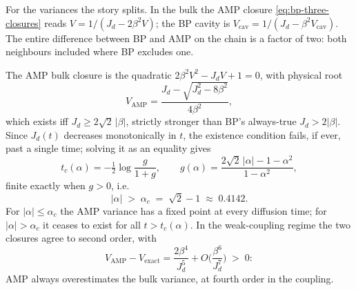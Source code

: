 For the variances the story splits. In the bulk the AMP closure
\eqref{eq:bp-three-closures} reads $V = 1/(J_d - 2\beta^2 V)$; the BP
cavity is $V_{\mathrm{cav}} = 1/(J_d - \beta^2 V_{\mathrm{cav}})$. The
entire difference between BP and AMP on the chain is a factor of two:
both neighbours included where BP excludes one.

\begin{theorem}
\label{thm:bp-amp-breakdown}
The AMP bulk closure is the quadratic $2\beta^2 V^2 - J_d V + 1 = 0$,
with physical root
\begin{equation}
  V_{\mathrm{AMP}}
  = \frac{J_d - \sqrt{J_d^2 - 8\beta^2}}{4\beta^2},
  \label{eq:bp-amp-var}
\end{equation}
which exists iff $J_d \geq 2\sqrt{2}\,|\beta|$, strictly stronger than
BP's always-true $J_d > 2|\beta|$. Since $J_d(t)$ decreases monotonically
in $t$, the existence condition fails, if ever, past a single time;
solving it as an equality gives
\begin{equation}
  \boxed{\;
  t_c(\alpha) = -\tfrac{1}{2} \log \frac{g}{1+g},
  \qquad
  g(\alpha) = \frac{2\sqrt{2}\,|\alpha| - 1 - \alpha^2}{1 - \alpha^2},
  \;}
  \label{eq:bp-tc}
\end{equation}
finite exactly when $g > 0$, i.e.
\begin{equation}
  \boxed{\;|\alpha| \;>\; \alpha_c \;=\; \sqrt{2} - 1 \;\approx\; 0.4142 .\;}
  \label{eq:bp-alphac}
\end{equation}
For $|\alpha| \leq \alpha_c$ the AMP variance has a fixed point at every
diffusion time; for $|\alpha| > \alpha_c$ it ceases to exist for all
$t > t_c(\alpha)$. In the weak-coupling regime the two closures agree to
second order, with
\begin{equation}
  V_{\mathrm{AMP}} - V_{\mathrm{exact}}
  = \frac{2\beta^4}{J_d^5} + O\!\Big(\frac{\beta^6}{J_d^7}\Big)
  \;>\; 0 :
  \label{eq:bp-weak}
\end{equation}
AMP always overestimates the bulk variance, at fourth order in the
coupling.
\end{theorem}

